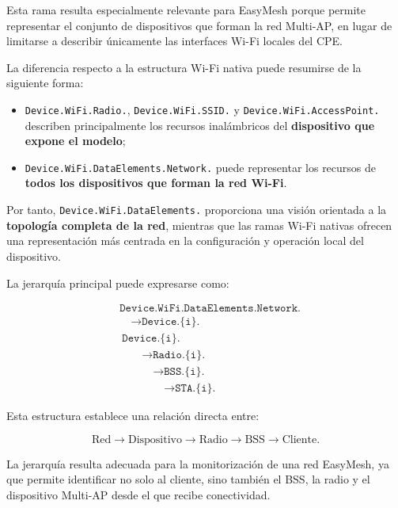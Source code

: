 Esta rama resulta especialmente relevante para EasyMesh porque permite
representar el conjunto de dispositivos que forman la red Multi-AP, en
lugar de limitarse a describir únicamente las interfaces Wi-Fi locales
del CPE.

La diferencia respecto a la estructura Wi-Fi nativa puede resumirse de
la siguiente forma:

\begin{itemize}
    \item \texttt{Device.WiFi.Radio.},
    \texttt{Device.WiFi.SSID.} y
    \texttt{Device.WiFi.AccessPoint.} describen principalmente los
    recursos inalámbricos del \textbf{dispositivo que expone el modelo};

    \item \texttt{Device.WiFi.DataElements.Network.} puede representar
    los recursos de \textbf{todos los dispositivos que forman la red
    Wi-Fi}.
\end{itemize}

Por tanto, \texttt{Device.WiFi.DataElements.} proporciona una visión
orientada a la \textbf{topología completa de la red}, mientras que las
ramas Wi-Fi nativas ofrecen una representación más centrada en la
configuración y operación local del dispositivo.

La jerarquía principal puede expresarse como:

\[
\begin{aligned}
    &\texttt{Device.WiFi.DataElements.Network.}\\
    &\quad\longrightarrow
    \texttt{Device.\{i\}.}\\
    &\    \texttt{Device.\{i\}.}\\
    &\qquad\longrightarrow
    \texttt{Radio.\{i\}.}\\
    &\qquad\quad\longrightarrow
    \texttt{BSS.\{i\}.}\\
    &\qquad\qquad\longrightarrow
    \texttt{STA.\{i\}.}
\end{aligned}
\]

Esta estructura establece una relación directa entre:

\[
    \text{Red}
    \longrightarrow
    \text{Dispositivo}
    \longrightarrow
    \text{Radio}
    \longrightarrow
    \text{BSS}
    \longrightarrow
    \text{Cliente}.
\]

La jerarquía resulta adecuada para la monitorización de una red EasyMesh,
ya que permite identificar no solo al cliente, sino también el BSS, la
radio y el dispositivo Multi-AP desde el que recibe conectividad.


